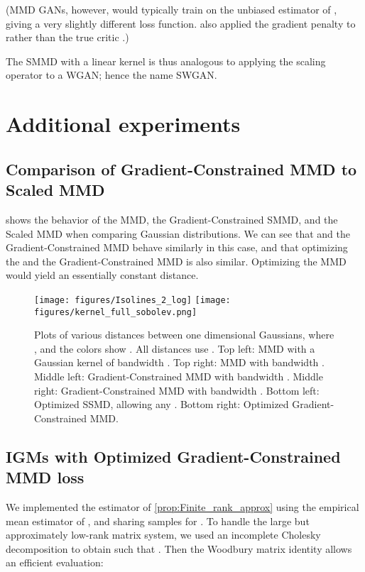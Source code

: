 \documentclass{article}
\begin{document}
(MMD GANs, however, would typically train on the unbiased estimator of ,
giving a very slightly different loss function.
\cite{Binkowski:2018} also applied the gradient penalty to  rather than the true critic .)

The SMMD with a linear kernel is thus analogous to applying the scaling operator to a WGAN;
hence the name SWGAN.


\section{Additional experiments}

\subsection{Comparison of Gradient-Constrained MMD to Scaled MMD} \label{appendix:gcmmd-smmd}

 shows the behavior of the MMD, the Gradient-Constrained SMMD, and the Scaled MMD when comparing Gaussian distributions.
We can see that  and the Gradient-Constrained MMD behave similarly in this case,
and that optimizing the  and the Gradient-Constrained MMD is also similar.
Optimizing the MMD would yield an essentially constant distance.

\begin{figure}[p]
  \centering
  \texttt{[image: figures/Isolines\_2\_log]}
  \texttt{[image: figures/kernel\_full\_sobolev.png]}
  \caption{Plots of various distances between one dimensional Gaussians,
    where ,
    and the colors show .
    All distances use .
    Top left: MMD with a Gaussian kernel of bandwidth .
    Top right: MMD with bandwidth .
    Middle left: Gradient-Constrained MMD with bandwidth .
    Middle right: Gradient-Constrained MMD with bandwidth .
    Bottom left: Optimized SSMD, allowing any .
    Bottom right: Optimized Gradient-Constrained MMD.
}
  \label{fig:isolines}
\end{figure}

\subsection{IGMs with Optimized Gradient-Constrained MMD loss} \label{appendix:sobolev-expt}

We implemented the estimator of \cref{prop:Finite_rank_approx}
using the empirical mean estimator of ,
and sharing samples for .
To handle the large but approximately low-rank matrix system,
we used an incomplete Cholesky decomposition \parencite[Algorithm 5.12]{shawe-taylor-christianini}
to obtain 
such that .
Then the Woodbury matrix identity allows an efficient evaluation:
\end{document}
